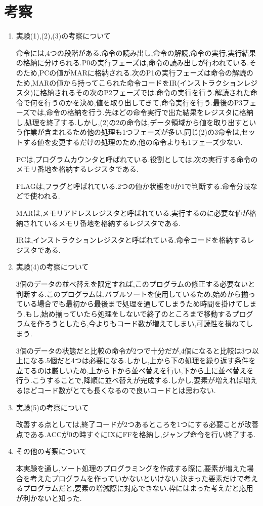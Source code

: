\documentclass[a4paper,11pt,titlepage]{jarticle}
\begin{document}
  \section{考察}
  \begin{enumerate}
  	\item 実験(1),(2),(3)の考察について\par
  		命令には,4つの段階がある.命令の読み出し,命令の解読,命令の実行,実行結果の格納に分けられる.P0の実行フェーズは,命令の読み出しが行われている.そのため,PCの値がMARに格納される.次のP1の実行フェーズは命令の解読のため,MARの値から持ってこられた命令コードをIR(インストラクションレジスタ)に格納されるその次のP2フェーズでは.命令の実行を行う.解読された命令で何を行うのかを決め,値を取り出してきて,命令実行を行う.最後のP3フェーズでは,命令の格納を行う.先ほどの命令実行で出た結果をレジスタに格納し,処理を終了する.しかし,(2)の2の命令は,データ領域から値を取り出すという作業が含まれるため他の処理も1つフェーズが多い.同じ(2)の3命令は,セットする値を変更するだけの処理のため,他の命令よりも1フェーズ少ない.\par
  		PCは,プログラムカウンタと呼ばれている.役割としては,次の実行する命令のメモリ番地を格納するレジスタである.\par
  		FLAGは,フラグと呼ばれている.2つの値か状態を0か1で判断する.命令分岐などで使われる.\par
  		MARは,メモリアドレスレジスタと呼ばれている.実行するのに必要な値が格納されているメモリ番地を格納するレジスタである.\par
  		IRは,インストラクションレジスタと呼ばれている.命令コードを格納するレジスタである.\par
  	\item	 実験(4)の考察について\par
  		3個のデータの並べ替えを限定すれば,このプログラムの修正する必要ないと判断する.このプログラムは,バブルソートを使用しているため,始めから揃っている場合でも最初から最後まで処理を通してしまうため時間を掛けてしまう.もし,始め揃っていたら処理をしないで終了のところまで移動するプログラムを作ろうとしたら,今よりもコード数が増えてしまい,可読性を損ねてしまう.\par
  		3個のデータの状態だと比較の命令が2つで十分だが,4個になると比較は3つ以上になる.5個だと4つは必要になる.しかし,上から下の処理を繰り返す条件を立てるのは厳しいため,上から下から並べ替えを行い,下から上に並べ替えを行う.こうすることで,降順に並べ替えが完成する.しかし,要素が増えれば増えるほどコード数がとても長くなるので良いコードとは思わない.\par
  	\item 実験(5)の考察について\par
  		改善する点としては,終了コードが2つあるところを1つにする必要ことが改善点である.ACCが0の時すぐにIXにFFを格納し,ジャンプ命令を行い終了する.\par
  	\item その他の考察について\par
  		本実験を通し,ソート処理のプログラミングを作成する際に,要素が増えた場合を考えたプログラムを作っていかないといけない.決まった要素だけで考えるプログラムだと,要素の増減際に対応できない.枠にはまった考えだと応用が利かないと知った.
  \end{enumerate}
\end{document}
